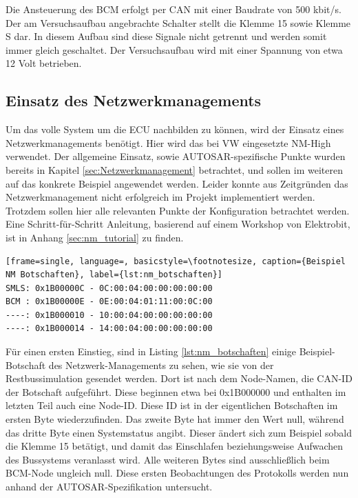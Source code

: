 \documentclass[
  a4paper,					    %
  twoside,
  DIV=calc,     				%
  bibliography=totoc,
  cleardoublepage=empty,
  ngerman,     					%
  final       					%
]{scrbook}
\begin{document}
Die Ansteuerung des BCM erfolgt per CAN mit einer Baudrate von 500 kbit/s. Der am Versuchsaufbau angebrachte Schalter stellt die Klemme 15 sowie Klemme S dar. In diesem Aufbau sind diese Signale nicht getrennt und werden somit immer gleich geschaltet. Der Versuchsaufbau wird mit einer Spannung von etwa 12 Volt betrieben.




\subsection{Einsatz des Netzwerkmanagements}
\label{sec:AutosarNM}
Um das volle System um die ECU nachbilden zu können, wird der Einsatz eines Netzwerkmanagements benötigt. Hier wird das bei VW eingesetzte NM-High verwendet. Der allgemeine Einsatz, sowie AUTOSAR-spezifische Punkte wurden bereits in Kapitel \ref{sec:Netzwerkmanagement} betrachtet, und sollen im weiteren auf das konkrete Beispiel angewendet werden. Leider konnte aus Zeitgründen das Netzwerkmanagement nicht erfolgreich im Projekt implementiert werden. Trotzdem sollen hier alle relevanten Punkte der Konfiguration betrachtet werden. Eine Schritt-für-Schritt Anleitung, basierend auf einem Workshop von Elektrobit, ist in Anhang \ref{sec:nm_tutorial} zu finden.

\begin{lstlisting}[frame=single, language=, basicstyle=\footnotesize, caption={Beispiel NM Botschaften}, label={lst:nm_botschaften}]
SMLS: 0x1B00000C - 0C:00:04:00:00:00:00:00
BCM : 0x1B00000E - 0E:00:04:01:11:00:0C:00
----: 0x1B000010 - 10:00:04:00:00:00:00:00
----: 0x1B000014 - 14:00:04:00:00:00:00:00
\end{lstlisting}

Für einen ersten Einstieg, sind in Listing \ref{lst:nm_botschaften} einige Beispiel-Botschaft des Netzwerk-Managements zu sehen, wie sie von der Restbussimulation gesendet werden. Dort ist nach dem Node-Namen, die CAN-ID der Botschaft aufgeführt. Diese beginnen etwa bei 0x1B000000 und enthalten im letzten Teil auch eine Node-ID. Diese ID ist in der eigentlichen Botschaften im ersten Byte wiederzufinden. Das zweite Byte hat immer den Wert null, während das dritte Byte einen Systemstatus angibt. Dieser ändert sich zum Beispiel sobald die Klemme 15 betätigt, und damit das Einschlafen beziehungsweise Aufwachen des Bussystems veranlasst wird. Alle weiteren Bytes sind ausschließlich beim BCM-Node ungleich null. Diese ersten Beobachtungen des Protokolls werden nun anhand der AUTOSAR-Spezifikation untersucht.
\end{document}

